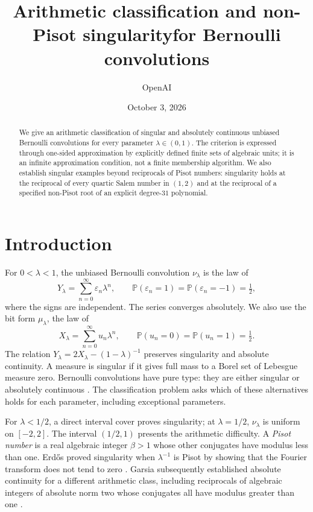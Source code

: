\documentclass[11pt]{article}
\title{Arithmetic classification and non-Pisot singularity\newline for Bernoulli convolutions}
\author{OpenAI}
\date{October 3, 2026}
\theoremstyle{definition}
\theoremstyle{remark}
\newcommand{\Pbb}{\mathbb P}
\numberwithin{equation}{section}
\begin{document}
\maketitle
\begin{abstract}
We give an arithmetic classification of singular and absolutely continuous unbiased Bernoulli convolutions for every parameter $\lambda\in(0,1)$. The criterion is expressed through one-sided approximation by explicitly defined finite sets of algebraic units; it is an infinite approximation condition, not a finite membership algorithm. We also establish singular examples beyond reciprocals of Pisot numbers: singularity holds at the reciprocal of every quartic Salem number in $(1,2)$ and at the reciprocal of a specified non-Pisot root of an explicit degree-$31$ polynomial.
\end{abstract}

\section{Introduction}\label{sec:introduction}
For $0<\lambda<1$, the unbiased Bernoulli convolution $\nu_\lambda$ is the law of
\begin{equation}\label{intro:series}
 Y_\lambda=\sum_{n=0}^{\infty}\varepsilon_n\lambda^n,
 \qquad \Pbb(\varepsilon_n=1)=\Pbb(\varepsilon_n=-1)=\tfrac12,
\end{equation}
where the signs are independent. The series converges absolutely. We also use the bit form $\mu_\lambda$, the law of
\[
 X_\lambda=\sum_{n=0}^{\infty}u_n\lambda^n,
 \qquad \Pbb(u_n=0)=\Pbb(u_n=1)=\tfrac12.
\]
The relation $Y_\lambda=2X_\lambda-(1-\lambda)^{-1}$ preserves singularity and absolute continuity. A measure is singular if it gives full mass to a Borel set of Lebesgue measure zero. Bernoulli convolutions have pure type: they are either singular or absolutely continuous \cite[Theorem~11]{JessenWintner1935}. The classification problem asks which of these alternatives holds for each parameter, including exceptional parameters.

For $\lambda<1/2$, a direct interval cover proves singularity; at $\lambda=1/2$, $\nu_\lambda$ is uniform on $[-2,2]$. The interval $(1/2,1)$ presents the arithmetic difficulty. A \emph{Pisot number} is a real algebraic integer $\beta>1$ whose other conjugates have modulus less than one. Erd\H{o}s proved singularity when $\lambda^{-1}$ is Pisot by showing that the Fourier transform does not tend to zero \cite{Erdos1939}. Garsia subsequently established absolute continuity for a different arithmetic class, including reciprocals of algebraic integers of absolute norm two whose conjugates all have modulus greater than one \cite{Garsia1962}.
\end{document}
